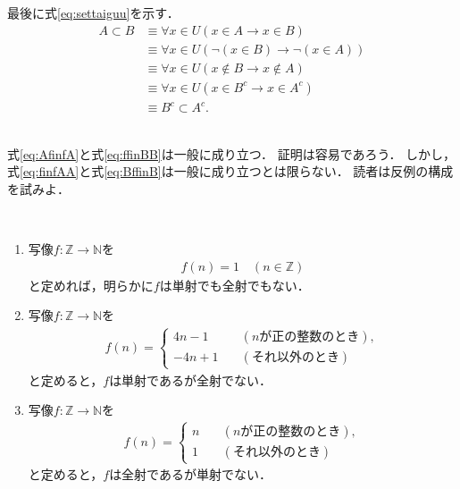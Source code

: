\begin{description}
  最後に式\eqref{eq:settaiguu}を示す．
  \begin{align*}
    A \subset B & \equiv \forall x \in U ( x \in A \to x \in B) \\
                & \equiv \forall x \in U ( \lnot (x \in B) \to \lnot (x \in A)) \\
                & \equiv \forall x \in U ( x \notin B \to x \notin A) \\
                & \equiv \forall x \in U ( x \in B^c \to x \in A^c) \\
                & \equiv B^c \subset A^c.
  \end{align*}
\item[\refque{que:mapsubset}] \mbox{} \\
  式\eqref{eq:AfinfA}と式\eqref{eq:ffinBB}は一般に成り立つ．
  証明は容易であろう．
  しかし，式\eqref{eq:finfAA}と式\eqref{eq:BffinB}は一般に成り立つとは限らない．
  読者は反例の構成を試みよ．
\item[\refque{que:ZNmapex}] \mbox{} \\
  \begin{enumerate}[(1) ]
    \item 写像$f: \mathbb{Z} \longrightarrow \mathbb{N}$を
      \begin{align*}
        f(n) = 1 \quad ( n \in \mathbb{Z})
      \end{align*}
      と定めれば，明らかに$f$は単射でも全射でもない．
    \item 写像$f: \mathbb{Z} \longrightarrow \mathbb{N}$を
      \begin{align*}
        f(n) = \left\{
        \begin{aligned} 
          4n-1 \quad & ( \text{$n$が正の整数のとき} ) , \\
          -4n+1 \quad & (\text{それ以外のとき} ) 
        \end{aligned}
        \right.
      \end{align*}
      と定めると，$f$は単射であるが全射でない．
    \item 写像$f: \mathbb{Z} \longrightarrow \mathbb{N}$を
      \begin{align*}
        f(n) = \left\{
          \begin{aligned}
            n \quad & ( \text{$n$が正の整数のとき} ) , \\
            1 \quad & ( \text{それ以外のとき} )
          \end{aligned}
        \right.
      \end{align*}
      と定めると，$f$は全射であるが単射でない．

\end{enumerate}
\end{description}
